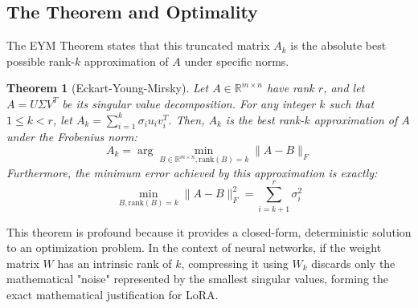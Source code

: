 \documentclass[11pt,journal,onecolumn]{IEEEtran}
\newtheorem{theorem}{Theorem}
\begin{document}
\subsection{The Theorem and Optimality}
The EYM Theorem states that this truncated matrix $A_k$ is the absolute best possible rank-$k$ approximation of $A$ under specific norms.

\begin{theorem}[Eckart-Young-Mirsky]
Let $A \in \mathbb{R}^{m \times n}$ have rank $r$, and let $A = U \Sigma V^T$ be its singular value decomposition. For any integer $k$ such that $1 \leq k < r$, let $A_k = \sum_{i=1}^{k} \sigma_i u_i v_i^T$. Then, $A_k$ is the best rank-$k$ approximation of $A$ under the Frobenius norm:
\begin{equation}
    A_k = \arg\min_{B \in \mathbb{R}^{m \times n}, \text{rank}(B)=k} \| A - B \|_F
\end{equation}
Furthermore, the minimum error achieved by this approximation is exactly:
\begin{equation}
    \min_{B, \text{rank}(B)=k} \| A - B \|_F^2 = \sum_{i=k+1}^{r} \sigma_i^2
\end{equation}
\end{theorem}

This theorem is profound because it provides a closed-form, deterministic solution to an optimization problem. In the context of neural networks, if the weight matrix $W$ has an intrinsic rank of $k$, compressing it using $W_k$ discards only the mathematical "noise" represented by the smallest singular values, forming the exact mathematical justification for LoRA.
\end{document}
